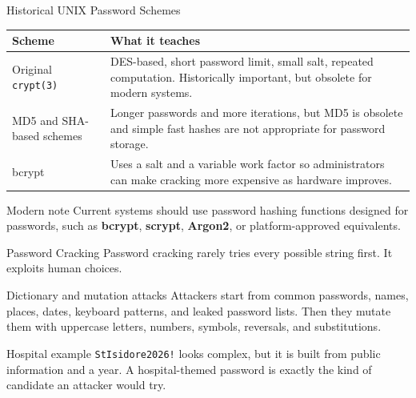 \documentclass[presentation]{beamer}
\begin{document}
\begin{frame}[c]{Historical UNIX Password Schemes}
  \small
  \begin{tabularx}{\textwidth}{@{}p{}X@{}}
    \toprule
    \textbf{Scheme} & \textbf{What it teaches} \\
    \midrule
    Original \texttt{crypt(3)} & DES-based, short password limit, small salt, repeated computation. Historically important, but obsolete for modern systems. \\
    MD5 and SHA-based schemes & Longer passwords and more iterations, but MD5 is obsolete and simple fast hashes are not appropriate for password storage. \\
    bcrypt & Uses a salt and a variable work factor so administrators can make cracking more expensive as hardware improves. \\
    \bottomrule
  \end{tabularx}

  \begin{block}{Modern note}
    Current systems should use password hashing functions designed for passwords, such as \textbf{bcrypt}, \textbf{scrypt}, \textbf{Argon2}, or platform-approved equivalents.
  \end{block}
\end{frame}

\begin{frame}[c]{Password Cracking}
  Password cracking rarely tries every possible string first. It exploits human choices.

  \begin{block}{Dictionary and mutation attacks}
    Attackers start from common passwords, names, places, dates, keyboard patterns, and leaked password lists. Then they mutate them with uppercase letters, numbers, symbols, reversals, and substitutions.
  \end{block}

  \begin{exampleblock}{Hospital example}
    \texttt{StIsidore2026!} looks complex, but it is built from public information and a year. A hospital-themed password is exactly the kind of candidate an attacker would try.
  \end{exampleblock}
\end{frame}
\end{document}
